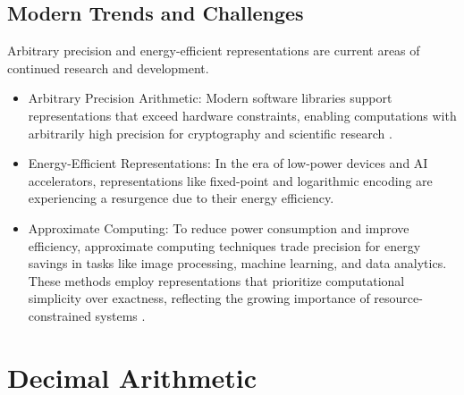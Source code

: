 \subsection{Modern Trends and Challenges}
Arbitrary precision and energy-efficient representations are current areas of continued research and development.

\begin{itemize}
    \item Arbitrary Precision Arithmetic: Modern software libraries support representations that exceed hardware constraints, enabling computations with arbitrarily high precision for cryptography and scientific research \cite{Parhami2010}.
    \item Energy-Efficient Representations: In the era of low-power devices and AI accelerators, representations like fixed-point and logarithmic encoding are experiencing a resurgence due to their energy efficiency.
    \item Approximate Computing: To reduce power consumption and improve efficiency, approximate computing techniques trade precision for energy savings in tasks like image processing, machine learning, and data analytics. These methods employ representations that prioritize computational simplicity over exactness, reflecting the growing importance of resource-constrained systems \cite{han2013approximate}.
\end{itemize}

\section{Decimal Arithmetic}

